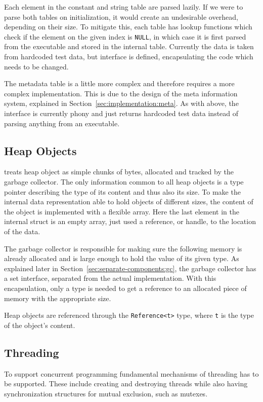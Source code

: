 Each element in the constant and string table are parsed lazily. If we were to
parse both tables on initialization, it would create an undesirable overhead,
depending on their size. To mitigate this, each table has lookup functions which
check if the element on the given index is {\tt NULL}, in which case it is first
parsed from the executable and stored in the internal table. Currently the data
is taken from hardcoded test data, but interface is defined, encapsulating the
code which needs to be changed.

The metadata table is a little more complex and therefore requires a more
complex implementation. This is due to the design of the meta information
system, explained in Section~\ref{sec:implementation:meta}. As with above, the
interface is currently phony and just returns hardcoded test data instead of
parsing anything from an executable.

\subsection{Heap Objects}

\thename{} treats heap object as simple chunks of bytes, allocated and tracked
by the garbage collector. The only information common to all heap objects is a
type pointer describing the type of its content and thus also its size. To make
the internal data representation able to hold objects of different sizes, the
content of the object is implemented with a flexible array. Here the last
element in the internal struct is an empty array, just used a reference, or
handle, to the location of the data.

The garbage collector is responsible for making sure the following memory is
already allocated and is large enough to hold the value of its given type. As
explained later in Section~\ref{sec:separate-components:gc}, the garbage
collector has a set interface, separated from the actual implementation. With
this encapsulation, only a type is needed to get a reference to an allocated
piece of memory with the appropriate size.

Heap objects are referenced through the {\tt Reference<t>} type, where {\tt t}
is the type of the object's content.

\subsection{Threading}

To support concurrent programming fundamental mechanisms of threading has to be
supported. These include creating and destroying threads while also having
synchronization structures for mutual exclusion, such as mutexes.

